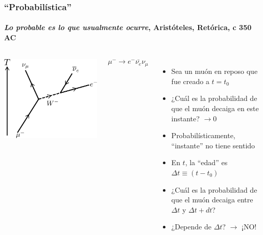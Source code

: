 \documentclass[xetex,mathserif,serif,10pt]{beamer}
\begin{document}
\begin{frame}
  \frametitle{``Probabilística''}
  \framesubtitle{\emph{Lo probable es lo que usualmente ocurre}, Aristóteles, Retórica, c 350 AC}
  \vspace{-0.5em}
  \begin{columns}
  \begin{columns}
    \begin{center}
      \includegraphics[width=1.0\columnwidth]{./figs/u01/muon-decay.png}
    \end{center}
    \vspace{+1em}
    \[ \mu^- \to e^- \bar{\nu_e} \nu_\mu \]
  \end{columns}
    \begin{itemize}
      \item Sea un muón en reposo que fue creado a $t=t_0$
      \item ¿Cuál es la probabilidad de que el muón decaiga en este instante? $\to 0$
      \item Probabilísticamente, ``instante'' no tiene sentido
      \item En $t$, la ``edad'' es $\Delta t \equiv (t-t_0)$
      \item ¿Cuál es la probabilidad de que el muón decaiga entre $\Delta t$ y $\Delta t + dt$?
      \item \alert{¿Depende de $\Delta t$?}
  \pause
    $\to$ {\Huge{\alert{¡NO!}}}
    \end{itemize}

\end{columns}
\end{frame}
\end{document}
